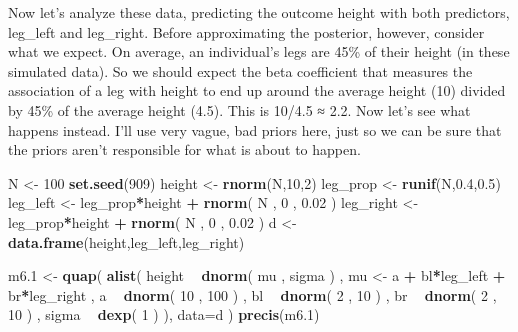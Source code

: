 \documentclass[
]{article}
\newenvironment{Shaded}{\begin{snugshade}}{\end{snugshade}}
\newcommand{\DataTypeTok}[1]{\textcolor[rgb]{0.13,0.29,0.53}{#1}}
\newcommand{\DecValTok}[1]{\textcolor[rgb]{0.00,0.00,0.81}{#1}}
\newcommand{\FloatTok}[1]{\textcolor[rgb]{0.00,0.00,0.81}{#1}}
\newcommand{\KeywordTok}[1]{\textcolor[rgb]{0.13,0.29,0.53}{\textbf{#1}}}
\newcommand{\NormalTok}[1]{#1}
\newcommand{\OperatorTok}[1]{\textcolor[rgb]{0.81,0.36,0.00}{\textbf{#1}}}
\newcommand{\StringTok}[1]{\textcolor[rgb]{0.31,0.60,0.02}{#1}}
\begin{document}
Now let's analyze these data, predicting the outcome height with both
predictors, leg\_left and leg\_right. Before approximating the
posterior, however, consider what we expect. On average, an individual's
legs are 45\% of their height (in these simulated data). So we should
expect the beta coefficient that measures the association of a leg with
height to end up around the average height (10) divided by 45\% of the
average height (4.5). This is 10/4.5 ≈ 2.2. Now let's see what happens
instead. I'll use very vague, bad priors here, just so we can be sure
that the priors aren't responsible for what is about to happen.

\begin{Shaded}
\begin{Highlighting}[]
\NormalTok{N <-}\StringTok{ }\DecValTok{100}
\KeywordTok{set.seed}\NormalTok{(}\DecValTok{909}\NormalTok{)}
\NormalTok{height <-}\StringTok{ }\KeywordTok{rnorm}\NormalTok{(N,}\DecValTok{10}\NormalTok{,}\DecValTok{2}\NormalTok{)}
\NormalTok{leg_prop <-}\StringTok{ }\KeywordTok{runif}\NormalTok{(N,}\FloatTok{0.4}\NormalTok{,}\FloatTok{0.5}\NormalTok{)}
\NormalTok{leg_left <-}\StringTok{ }\NormalTok{leg_prop}\OperatorTok{*}\NormalTok{height }\OperatorTok{+}
\StringTok{    }\KeywordTok{rnorm}\NormalTok{( N , }\DecValTok{0}\NormalTok{ , }\FloatTok{0.02}\NormalTok{ )}
\NormalTok{leg_right <-}\StringTok{ }\NormalTok{leg_prop}\OperatorTok{*}\NormalTok{height }\OperatorTok{+}
\StringTok{    }\KeywordTok{rnorm}\NormalTok{( N , }\DecValTok{0}\NormalTok{ , }\FloatTok{0.02}\NormalTok{ )}
\NormalTok{d <-}\StringTok{ }\KeywordTok{data.frame}\NormalTok{(height,leg_left,leg_right)}


\NormalTok{m6}\FloatTok{.1}\NormalTok{ <-}\StringTok{ }\KeywordTok{quap}\NormalTok{(}
    \KeywordTok{alist}\NormalTok{(}
\NormalTok{        height }\OperatorTok{~}\StringTok{ }\KeywordTok{dnorm}\NormalTok{( mu , sigma ) ,}
\NormalTok{        mu <-}\StringTok{ }\NormalTok{a }\OperatorTok{+}\StringTok{ }\NormalTok{bl}\OperatorTok{*}\NormalTok{leg_left }\OperatorTok{+}\StringTok{ }\NormalTok{br}\OperatorTok{*}\NormalTok{leg_right ,}
\NormalTok{        a }\OperatorTok{~}\StringTok{ }\KeywordTok{dnorm}\NormalTok{( }\DecValTok{10}\NormalTok{ , }\DecValTok{100}\NormalTok{ ) ,}
\NormalTok{        bl }\OperatorTok{~}\StringTok{ }\KeywordTok{dnorm}\NormalTok{( }\DecValTok{2}\NormalTok{ , }\DecValTok{10}\NormalTok{ ) ,}
\NormalTok{        br }\OperatorTok{~}\StringTok{ }\KeywordTok{dnorm}\NormalTok{( }\DecValTok{2}\NormalTok{ , }\DecValTok{10}\NormalTok{ ) ,}
\NormalTok{        sigma }\OperatorTok{~}\StringTok{ }\KeywordTok{dexp}\NormalTok{( }\DecValTok{1}\NormalTok{ )}
\NormalTok{),}
    \DataTypeTok{data=}\NormalTok{d )}
\KeywordTok{precis}\NormalTok{(m6}\FloatTok{.1}\NormalTok{)}
\end{Highlighting}
\end{Shaded}
\end{document}
